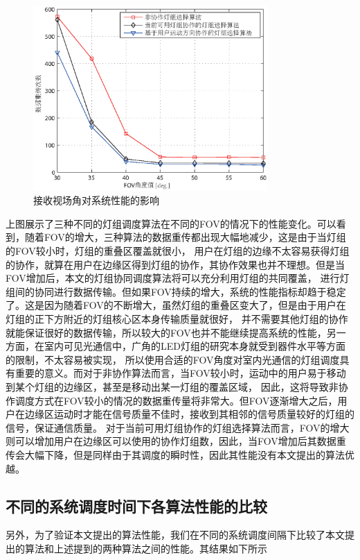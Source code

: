 \begin{figure}[htbp]
    \centering
	\includegraphics[width=0.8\textwidth]{figures/chapter-4/DistributionUserFov.eps}
	\caption{接收视场角对系统性能的影响}
	\label{fig:distribution-user-fov}
\end{figure}

上图展示了三种不同的灯组调度算法在不同的FOV的情况下的性能变化。可以看到，随着FOV的增大，三种算法的数据重传都出现大幅地减少，这是由于当灯组的FOV较小时，灯组的重叠区覆盖就很小，
用户在灯组的边缘不太容易获得灯组的协作，就算在用户在边缘区得到灯组的协作，其协作效果也并不理想。但是当FOV增加后，本文的灯组协同调度算法将可以充分利用灯组的共同覆盖，
进行灯组间的协同进行数据传输。但如果FOV持续的增大，系统的性能指标却趋于稳定了。这是因为随着FOV的不断增大，虽然灯组的重叠区变大了，但是由于用户在灯组的正下方附近的灯组核心区本身传输质量就很好，
并不需要其他灯组的协作就能保证很好的数据传输，所以较大的FOV也并不能继续提高系统的性能，另一方面，在室内可见光通信中，广角的LED灯组的研究本身就受到器件水平等方面的限制，不太容易被实现，
所以使用合适的FOV角度对室内光通信的灯组调度具有重要的意义。而对于非协作算法而言，当FOV较小时，运动中的用户易于移动到某个灯组的边缘区，甚至是移动出某一灯组的覆盖区域，
因此，这将导致非协作调度方式在FOV较小的情况的数据重传量将非常大。但FOV逐渐增大之后，用户在边缘区运动时才能在信号质量不佳时，接收到其相邻的信号质量较好的灯组的信号，保证通信质量。
对于当前可用灯组协作的灯组选择算法而言，FOV的增大则可以增加用户在边缘区可以使用的协作灯组数，因此，当FOV增加后其数据重传会大幅下降，但是同样由于其调度的瞬时性，因此其性能没有本文提出的算法优越。

\subsection{不同的系统调度时间下各算法性能的比较}
另外，为了验证本文提出的算法性能，我们在不同的系统调度间隔下比较了本文提出的算法和上述提到的两种算法之间的性能。其结果如下所示

